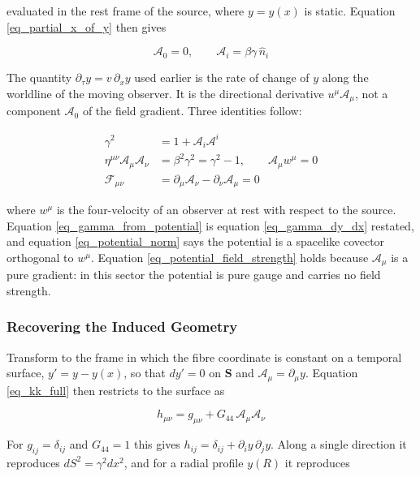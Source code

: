 \documentclass[pdflatex,sn-mathphys-num]{sn-jnl}%
\theoremstyle{thmstyleone}%
\theoremstyle{thmstyletwo}%
\theoremstyle{thmstylethree}%
\begin{document}
evaluated in the rest frame of the source, where $y=y(x)$ is static. Equation \ref{eq_partial_x_of_y} then gives

\begin{equation}\label{eq_potential_components}
    \mathcal{A}_0 = 0,
    \qquad
    \mathcal{A}_i = \beta\gamma\,\hat{n}_i
\end{equation}

The quantity $\partial_\tau y=v\,\partial_x y$ used earlier is the rate of change of $y$ along the worldline of the moving observer. It is the directional derivative $u^\mu\mathcal{A}_\mu$, not a component $\mathcal{A}_0$ of the field gradient. Three identities follow:

\begin{align}
    \gamma^2 &= 1+\mathcal{A}_i\mathcal{A}^i
    \label{eq_gamma_from_potential}\\
    \eta^{\mu\nu}\mathcal{A}_\mu\mathcal{A}_\nu
    &= \beta^2\gamma^2 = \gamma^2-1,
    \qquad
    \mathcal{A}_\mu w^\mu = 0
    \label{eq_potential_norm}\\
    \mathcal{F}_{\mu\nu} &= \partial_\mu\mathcal{A}_\nu-\partial_\nu\mathcal{A}_\mu = 0
    \label{eq_potential_field_strength}
\end{align}

where $w^\mu$ is the four-velocity of an observer at rest with respect to the source. Equation \ref{eq_gamma_from_potential} is equation \ref{eq_gamma_dy_dx} restated, and equation \ref{eq_potential_norm} says the potential is a spacelike covector orthogonal to $w^\mu$. Equation \ref{eq_potential_field_strength} holds because $\mathcal{A}_\mu$ is a pure gradient: in this sector the potential is pure gauge and carries no field strength.

\subsubsection{Recovering the Induced Geometry}

Transform to the frame in which the fibre coordinate is constant on a temporal surface, $y'=y-y(x)$, so that $dy'=0$ on $\mathbf{S}$ and $\mathcal{A}_\mu=\partial_\mu y$. Equation \ref{eq_kk_full} then restricts to the surface as

\begin{equation}
    h_{\mu\nu}=g_{\mu\nu}+G_{44}\,\mathcal{A}_\mu\mathcal{A}_\nu
\end{equation}

For $g_{ij}=\delta_{ij}$ and $G_{44}=1$ this gives $h_{ij}=\delta_{ij}+\partial_i y\,\partial_j y$. Along a single direction it reproduces $dS^2=\gamma^2dx^2$, and for a radial profile $y(R)$ it reproduces
\end{document}
